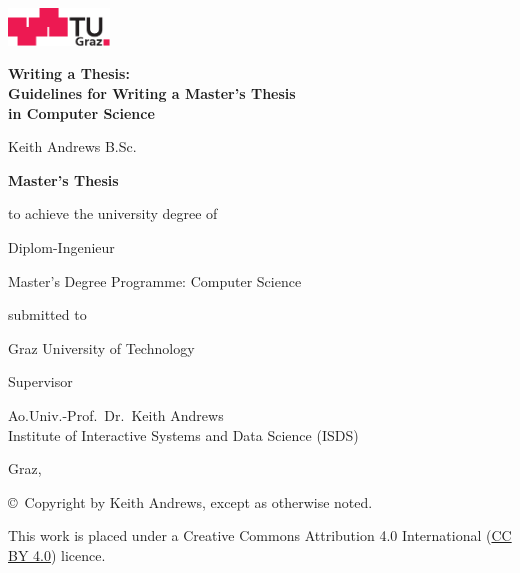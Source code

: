 \begin{center}
\includegraphics[height=1cm]{diagrams/tugraz-logo.pdf}

\vspace{2cm}

\begin{spacing}{1.1}
\huge\sffamily\bfseries
Writing a Thesis:\\
Guidelines for Writing a Master's Thesis\\
in Computer Science
\end{spacing}

\vspace{2cm}

{\Large\sffamily Keith Andrews B.Sc.}

\vspace{2cm}

{\Large\sffamily\bfseries Master's Thesis}

\vspace{5mm}

{\small\sffamily to achieve the university degree of}

\vspace{5mm}

{\normalsize\sffamily Diplom-Ingenieur}

\vspace{5mm}

{\normalsize\sffamily
Master's Degree Programme: Computer Science
}


\vspace{1cm}

{\small\sffamily submitted to}

\vspace{5mm}

{\large\sffamily Graz University of Technology}



\vspace{1cm}

{\small\sffamily Supervisor}

\vspace{5mm}

{\normalsize\sffamily
Ao.Univ.-Prof.\ Dr.\ Keith Andrews \\
Institute of Interactive Systems and Data Science (ISDS)
}


\vspace{1cm}

{\normalsize\sffamily Graz, \thisdate}



\vfill

{\footnotesize\sffamily \copyright~Copyright \thisyear{} by Keith Andrews,
except as otherwise noted.}

{\footnotesize\sffamily This work is placed under a
Creative Commons Attribution 4.0 International
(\href{https://creativecommons.org/licenses/by/4.0/}{CC BY 4.0}) licence.}


\end{center}





